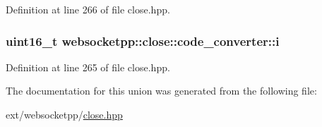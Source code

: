 Definition at line 266 of file close.\+hpp.

\hypertarget{unionwebsocketpp_1_1close_1_1code__converter_aa8ed980b85e36e51a24f7eb95c2c3bf7}{}
\subsubsection[{i}]{\setlength{\rightskip}{0pt plus 5cm}uint16\+\_\+t websocketpp\+::close\+::code\+\_\+converter\+::i}\label{unionwebsocketpp_1_1close_1_1code__converter_aa8ed980b85e36e51a24f7eb95c2c3bf7}


Definition at line 265 of file close.\+hpp.



The documentation for this union was generated from the following file\+:\begin{DoxyCompactItemize}
\item 
ext/websocketpp/\hyperlink{close_8hpp}{close.\+hpp}\end{DoxyCompactItemize}
